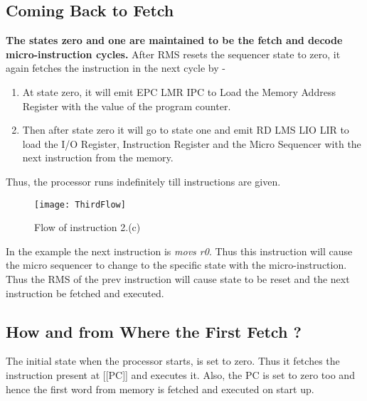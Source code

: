 \subsection{Coming Back to Fetch} \textbf{The states zero and one are maintained to be the fetch and decode micro-instruction cycles.} After RMS resets the sequencer state to zero, it again fetches the instruction in the next cycle by -

\begin{enumerate}
    \item At state zero, it will emit EPC LMR IPC to Load the Memory Address Register              with the value of the program counter.
    \item Then after state zero it will go to state one and emit RD LMS LIO LIR to load            the I/O Register, Instruction Register and the Micro Sequencer with the next
          instruction from the memory.
\end{enumerate}
Thus, the processor runs indefinitely till instructions are given.

\begin{figure}[h]
    \begin{center}
        \texttt{[image: ThirdFlow]}
    \end{center}
    \caption{Flow of instruction 2.(c)}
\end{figure}

In the example the next instruction is \textit{movs r0}. Thus this instruction will cause the micro sequencer to change to the specific state with the micro-instruction. Thus the RMS of the prev instruction will cause state to be reset and the next instruction be fetched and executed.

\subsection{How and from Where the First Fetch ?} The initial state when the processor starts, is set to zero. Thus it fetches the instruction present at [[PC]] and executes it. Also, the PC is set to zero too and hence the first word from memory is fetched and executed on start up.